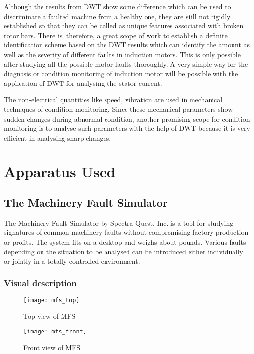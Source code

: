 \documentclass[a4paper,11pt]{report}
\begin{document}
Although the results from DWT show some difference which can be used to discriminate a faulted machine from a healthy one, they are still not rigidly established so that they can be called as unique features associated with broken rotor bars. There is, therefore, a great scope of work to establish a definite identification scheme based on the DWT results which can identify the amount as well as the severity of different faults in induction motors. This is only possible after studying all the possible motor faults thoroughly. A very simple way for the diagnosis or condition monitoring of induction motor will be possible with the application of DWT for analysing the stator current. 

The non-electrical quantities like speed, vibration are used in mechanical techniques of condition monitoring. Since these mechanical parameters show sudden changes during abnormal condition, another promising scope for condition monitoring is to analyse such parameters with the help of DWT because it is very efficient in analysing sharp changes.


\appendix
\chapter{Apparatus Used}

\section{The Machinery Fault Simulator} \label{MFS}
The Machinery Fault Simulator by Spectra Quest, Inc. is a tool for studying signatures of common machinery faults without compromising factory production or profits. The system fits on a desktop and weighs about \unit[130]{pounds}. Various faults depending on the situation to be analysed can be introduced either individually or jointly in a totally controlled environment.

\subsection{Visual description}
\vfill
\begin{figure}[hb] 
\centering
\texttt{[image: mfs\_top]}
\caption{Top view of MFS} \label{mfs_top}
\end{figure} 

\clearpage

\begin{figure}[t] 
\centering
\texttt{[image: mfs\_front]}
\caption{Front view of MFS} \label{mfs_front}
\end{figure} 
\end{document}
